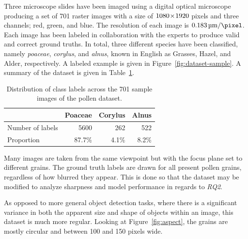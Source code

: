 Three microscope slides have been imaged using a digital optical microscope producing a set of 701 raster images with a size of \(1080\!\times \! 1920\) pixels and three channels; red, green, and blue.
The resolution of each image is \(\SI{0.183}{\micro\metre\per\pixel}\).
Each image has been labeled in collaboration with the experts to produce valid and correct ground truths.
In total, three different species have been classified, namely \textit{poaceae}, \textit{corylus}, and \textit{alnus}, known in English as Grasses, Hazel, and Alder, respectively.
A labeled example is given in Figure~\ref{fig:dataset-sample}.
A summary of the dataset is given in Table~\ref{tab:dataset}.

\begin{table}[htbp]
  \caption[Class distribution across the dataset]{Distribution of class labels across the 701 sample images of the pollen dataset.}\label{tab:dataset}
  \centering
  \begin{tabular}{lrrr} \toprule
                      & Poaceae & Corylus & Alnus \\ \midrule
    Number of labels  & 5600    & 262     & 522 \\
    Proportion        & 87.7\%  & 4.1\%   & 8.2\% \\ \bottomrule
  \end{tabular}
\end{table}

Many images are taken from the same viewpoint but with the focus plane set to different grains.
The ground truth labels are drawn for all present pollen grains, regardless of how blurred they appear.
This is done so that the dataset may be modified to analyze sharpness and model performance in regards to \textit{RQ2}.

As opposed to more general object detection tasks, where there is a significant variance in both the apparent size and shape of objects within an image, this dataset is much more regular.
Looking at Figure~\ref{fig:aspect}, the grains are mostly circular and between 100 and 150 pixels wide.

